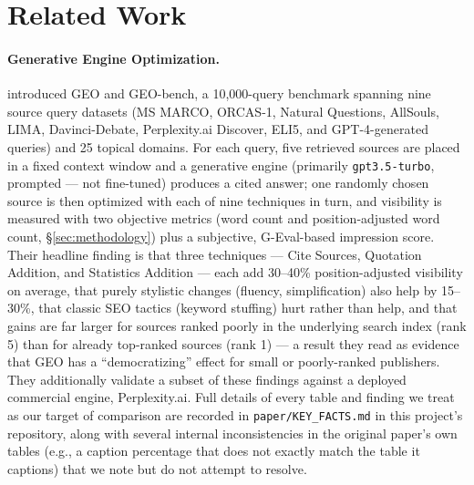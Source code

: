 \documentclass[11pt,a4paper]{article}
\begin{document}
\section{Related Work}
\label{sec:related-work}

\paragraph{Generative Engine Optimization.} \citet{aggarwal2024geo}
introduced GEO and GEO-bench, a 10{,}000-query benchmark spanning nine
source query datasets (MS MARCO, ORCAS-1, Natural Questions, AllSouls, LIMA,
Davinci-Debate, Perplexity.ai Discover, ELI5, and GPT-4-generated queries)
and 25 topical domains. For each query, five retrieved sources are placed in
a fixed context window and a generative engine (primarily
\texttt{gpt3.5-turbo}, prompted --- not fine-tuned) produces a cited answer;
one randomly chosen source is then optimized with each of nine techniques in
turn, and visibility is measured with two objective metrics (word count and
position-adjusted word count, \S\ref{sec:methodology}) plus a subjective,
G-Eval-based impression score. Their headline finding is that three
techniques --- Cite Sources, Quotation Addition, and Statistics Addition ---
each add 30--40\% position-adjusted visibility on average, that purely
stylistic changes (fluency, simplification) also help by 15--30\%, that
classic SEO tactics (keyword stuffing) hurt rather than help, and that gains
are far larger for sources ranked poorly in the underlying search index
(rank 5) than for already top-ranked sources (rank 1) --- a result they read
as evidence that GEO has a ``democratizing'' effect for small or
poorly-ranked publishers. They additionally validate a subset of these
findings against a deployed commercial engine, Perplexity.ai. Full details
of every table and finding we treat as our target of comparison are
recorded in \texttt{paper/KEY\_FACTS.md} in this project's repository, along
with several internal inconsistencies in the original paper's own tables
(e.g., a caption percentage that does not exactly match the table it
captions) that we note but do not attempt to resolve.
\end{document}

